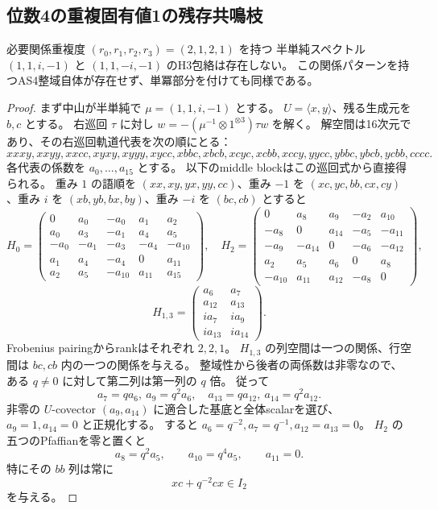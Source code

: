 \subsection{位数4の重複固有値1の残存共鳴枝}
\label{subsec:cubic-fourth-root-unit-repeat-resonance}
\begin{theorem}
\label{thm:cubic-fourth-root-unit-repeat-resonance-empty}
必要関係重複度 $(r_0,r_1,r_2,r_3)=(2,1,2,1)$ を持つ
半単純スペクトル $(1,1,i,-1)$ と $(1,1,-i,-1)$ のH3包絡は存在しない。
この関係パターンを持つAS4整域自体が存在せず、単冪部分を付けても同様である。
\end{theorem}
\begin{proof}
まず中山が半単純で $\mu=(1,1,i,-1)$ とする。
$U=\langle x,y\rangle$、残る生成元を $b,c$ とする。
右巡回 $\tau$ に対し $w=-(\mu^{-1}\otimes1^{\otimes3})\tau w$ を解く。
解空間は16次元であり、その右巡回軌道代表を次の順にとる：
\[
 xxxy,xxyy,xxcc,xyxy,xyyy,xycc,xbbc,xbcb,
 xcyc,xcbb,xccy,yycc,ybbc,ybcb,ycbb,cccc.
\]
各代表の係数を $a_0,\ldots,a_{15}$ とする。
以下のmiddle blockはこの巡回式から直接得られる。
重み $1$ の語順を $(xx,xy,yx,yy,cc)$、重み $-1$ を
$(xc,yc,bb,cx,cy)$、重み $i$ を $(xb,yb,bx,by)$、重み $-i$ を $(bc,cb)$ とすると
\[
 H_0=\begin{pmatrix}
 0&a_0&-a_0&a_1&a_2\\
 a_0&a_3&-a_1&a_4&a_5\\
 -a_0&-a_1&-a_3&-a_4&-a_{10}\\
 a_1&a_4&-a_4&0&a_{11}\\
 a_2&a_5&-a_{10}&a_{11}&a_{15}
 \end{pmatrix},\quad
 H_2=\begin{pmatrix}
 0&a_8&a_9&-a_2&a_{10}\\
 -a_8&0&a_{14}&-a_5&-a_{11}\\
 -a_9&-a_{14}&0&-a_6&-a_{12}\\
 a_2&a_5&a_6&0&a_8\\
 -a_{10}&a_{11}&a_{12}&-a_8&0
 \end{pmatrix},
\]
\[
 H_{1,3}=\begin{pmatrix}a_6&a_7\\a_{12}&a_{13}\\
 ia_7&ia_9\\ia_{13}&ia_{14}\end{pmatrix}.
\]
Frobenius pairingからrankはそれぞれ $2,2,1$。
$H_{1,3}$ の列空間は一つの関係、行空間は $bc,cb$ 内の一つの関係を与える。
整域性から後者の両係数は非零なので、ある $q\ne0$ に対して第二列は第一列の $q$ 倍。
従って
\[
 a_7=qa_6,\ a_9=q^2a_6,\quad
 a_{13}=qa_{12},\ a_{14}=q^2a_{12}.
\]
非零の $U$-covector $(a_9,a_{14})$ に適合した基底と全体scalarを選び、
$a_9=1,a_{14}=0$ と正規化する。
すると $a_6=q^{-2},a_7=q^{-1},a_{12}=a_{13}=0$。
$H_2$ の五つのPfaffianを零と置くと
\[
 a_8=q^2a_5,\qquad a_{10}=q^4a_5,\qquad a_{11}=0.
\tag{*}
\]
特にその $bb$ 列は常に
\[
 xc+q^{-2}cx\in I_2
\tag{**}
\]
を与える。


\end{proof}
